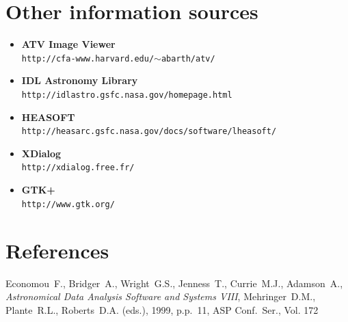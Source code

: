 \documentclass[twoside,11pt]{article}
\newcommand{\htmladdnormallink}[2]{#1}
\newcommand{\xlabel}[1]{}
\begin{document}
\section{\xlabel{sc16_sources}Other information sources\label{sc16_sources}}

\begin{small}
\begin{itemize}


\item {\bf\label{sc16_sources_atv}ATV Image Viewer}\\
\htmladdnormallink{{\tt http://cfa-www.harvard.edu/$\sim$abarth/atv/}}{http://cfa-www.harvard.edu/~abarth/atv/}

\item {\bf\label{sc16_sources_fitsidl}IDL Astronomy Library}\\
\htmladdnormallink{{\tt http://idlastro.gsfc.nasa.gov/homepage.html}}{http://idlastro.gsfc.nasa.gov/homepage.html}

\item {\bf\label{sc16_sources_heasoft}HEASOFT}\\
\htmladdnormallink{{\tt http://heasarc.gsfc.nasa.gov/docs/software/lheasoft/}}{http://heasarc.gsfc.nasa.gov/docs/software/lheasoft/}

\item {\bf\label{sc16_sources_xdialog}XDialog}\\
\htmladdnormallink{{\tt http://xdialog.free.fr/}}{http://xdialog.free.fr/}

\item {\bf\label{sc16_sources_gtk}GTK+}\\
\htmladdnormallink{{\tt http://www.gtk.org/}}{http://www.gtk.org/}

\end{itemize}
\end{small}

\section*{\xlabel{sc16_refs}References\label{sc16_refs}}

Economou~F., Bridger~A., Wright~G.S., Jenness~T., Currie~M.J., Adamson~A., {\em Astronomical Data Analysis Software and Systems VIII}, Mehringer~D.M., Plante~R.L., Roberts~D.A. (eds.), 1999, p.p.\ 11, ASP Conf.\ Ser., Vol. 172
\end{document}
